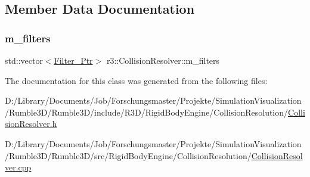 \subsection{Member Data Documentation}
\mbox{\label{classr3_1_1_collision_resolver_abf1234ad45ba7f114b31950c90ccaaff}} 
\subsubsection{\texorpdfstring{m\+\_\+filters}{m\_filters}}
{\footnotesize\ttfamily std\+::vector$<$\mbox{\hyperlink{classr3_1_1_collision_resolver_ad1c9ca40341498c0fe4d483d21c8eb9b}{Filter\+\_\+\+Ptr}}$>$ r3\+::\+Collision\+Resolver\+::m\+\_\+filters\hspace{0.3cm}{\ttfamily [protected]}}



The documentation for this class was generated from the following files\+:\begin{DoxyCompactItemize}
\item 
D\+:/\+Library/\+Documents/\+Job/\+Forschungsmaster/\+Projekte/\+Simulation\+Visualization/\+Rumble3\+D/\+Rumble3\+D/include/\+R3\+D/\+Rigid\+Body\+Engine/\+Collision\+Resolution/\mbox{\hyperlink{_collision_resolver_8h}{Collision\+Resolver.\+h}}\item 
D\+:/\+Library/\+Documents/\+Job/\+Forschungsmaster/\+Projekte/\+Simulation\+Visualization/\+Rumble3\+D/\+Rumble3\+D/src/\+Rigid\+Body\+Engine/\+Collision\+Resolution/\mbox{\hyperlink{_collision_resolver_8cpp}{Collision\+Resolver.\+cpp}}\end{DoxyCompactItemize}
